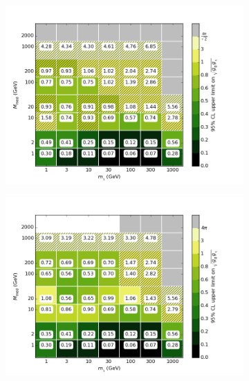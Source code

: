\begin{figure}[h]
  \centering
    \begin{subfigure}[t]{0.45\textwidth}
      \centering
      \includegraphics[width=1.\textwidth]{figures/grid_allpoints_SAD_rat05.png}
      \caption{}
    \end{subfigure}
    \begin{subfigure}[t]{0.45\textwidth}
      \centering
      \includegraphics[width=1.\textwidth]{figures/grid_allpoints_SAD_rat1.png}
      \caption{}
    \end{subfigure}
    \begin{subfigure}[t]{0.45\textwidth}
      \centering

\end{subfigure}
\end{figure}
